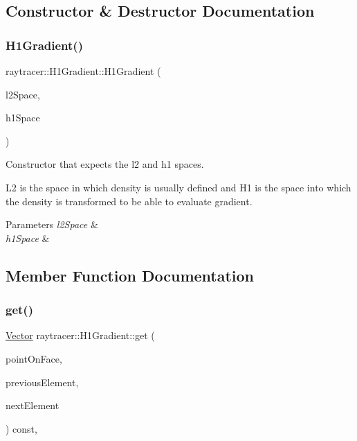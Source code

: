 \subsection{Constructor \& Destructor Documentation}
\mbox{\label{classraytracer_1_1H1Gradient_a7499a9dcb45b6c813b09fe14d08d98e4}} 
\subsubsection{\texorpdfstring{H1\+Gradient()}{H1Gradient()}}
{\footnotesize\ttfamily raytracer\+::\+H1\+Gradient\+::\+H1\+Gradient (\begin{DoxyParamCaption}\item[{mfem\+::\+Finite\+Element\+Space \&}]{l2\+Space,  }\item[{mfem\+::\+Finite\+Element\+Space \&}]{h1\+Space }\end{DoxyParamCaption})}



Constructor that expects the l2 and h1 spaces. 

L2 is the space in which density is usually defined and H1 is the space into which the density is transformed to be able to evaluate gradient. 
\begin{DoxyParams}{Parameters}
{\em l2\+Space} & \\
\hline
{\em h1\+Space} & \\
\hline
\end{DoxyParams}


\subsection{Member Function Documentation}
\mbox{\label{classraytracer_1_1H1Gradient_a7c847fef0d9cb6fbd143552acace82a5}} 
\subsubsection{\texorpdfstring{get()}{get()}}
{\footnotesize\ttfamily \hyperlink{classraytracer_1_1Vector}{Vector} raytracer\+::\+H1\+Gradient\+::get (\begin{DoxyParamCaption}\item[{const \hyperlink{structraytracer_1_1PointOnFace}{Point\+On\+Face} \&}]{point\+On\+Face,  }\item[{const \hyperlink{classraytracer_1_1Element}{Element} \&}]{previous\+Element,  }\item[{const \hyperlink{classraytracer_1_1Element}{Element} \&}]{next\+Element }\end{DoxyParamCaption}) const\hspace{0.3cm}{\ttfamily [override]}, {\ttfamily [virtual]}}



